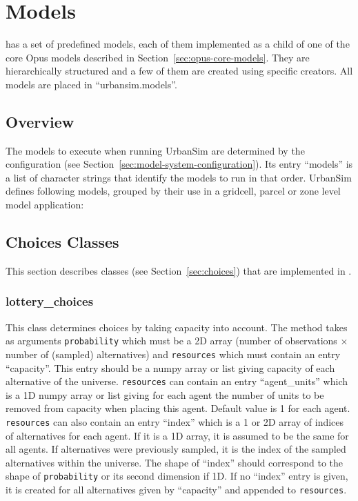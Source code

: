 \section{Models}
\label{sec:urbansim-models}
\modelsindex

 has a set of predefined models, \modelsindex each
of them implemented as a child of one of the core Opus models
\modelsindex described in Section~\ref{sec:opus-core-models}.  They
are hierarchically structured and a few of them are created using
specific creators.  All
 models \modelsindex are placed in
``urbansim.models''.


\subsection{Overview}

The models \modelsindex to execute when running UrbanSim are determined by the configuration
(see Section~\ref{sec:model-system-configuration}). Its entry ``models'' \modelsindex is a
list of character strings that identify the models \modelsindex to run in that order.
UrbanSim defines following models, grouped by their use in a gridcell, parcel or zone level model
application: \modelsindex



%
\subsection{Choices Classes}
%
\label{sec:urbansim-choices}
This section describes  classes (see
Section~\ref{sec:choices}) that are implemented in .

\subsubsection{lottery_choices}
%
This class determines choices by taking capacity into account. The
 method takes as arguments \verb|probability| which must be a 2D
array (number of observations $\times$ number of (sampled) alternatives) and
\verb|resources| which must contain an entry ``capacity''. This entry should
be a numpy array \numpyindex or list giving capacity of each alternative of the universe.
\verb|resources| can contain an entry ``agent_units'' which is a 1D numpy array \numpyindex
or list giving for each agent the number of units to be removed from capacity
when placing this agent. Default value is 1 for each agent.  \verb|resources|
can also contain an entry ``index'' which is a 1 or 2D array of indices of
alternatives for each agent. If it is a 1D array, it is assumed to be the same
for all agents. If alternatives were previously sampled, it is the index of
the sampled alternatives within the universe. The shape of ``index'' should
correspond to the shape of \verb|probability| or its second dimension if 1D.
If no ``index'' entry is given, it is created for all alternatives given by
``capacity'' and appended to \verb|resources|.

